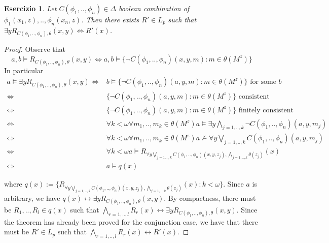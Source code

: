 \documentclass{article}
\newtheorem{exercise}{Esercizio}
\begin{document}
\begin{exercise}

	Let $C(\phi_1,..,\phi_n) \in \Delta$ boolean combination of $\phi_1(x_1,z),..,\phi_n(x_n,z)$.
	Then there exists $R' \in L_p$ such that $\exists y R_{C(\phi_1,..,\phi_n),\theta} (x,y) \iff R'(x)$.

\end{exercise}

\begin{proof}

	Observe that 
	\[
		a,b \models R_{C(\phi_1,..,\phi_n),\theta}(x,y) \iff a,b \models \{\neg C(\phi_1,..,\phi_n) (x,y,m) : m \in \theta(M^z) \}
	\]
	In particular 
	\begin{align*}
		a \models \exists y R_{C(\phi_1,..,\phi_n),\theta}(x,y) \iff & b \models \{\neg C(\phi_1,..,\phi_n)(a,y,m) : m \in \theta(M^z) \} \text{ for some } b \\
		\iff &  \{\neg C(\phi_1,..,\phi_n)(a,y,m) : m \in \theta(M^z) \} \text{ consistent } \\
		\iff &  \{\neg C(\phi_1,..,\phi_n)(a,y,m) : m \in \theta(M^z) \} \text{ finitely consistent } \\
		\iff & \forall k < \omega \forall m_1,..,m_k \in \theta(M^z) a \models \exists y \bigwedge_{j = 1,..,k} \neg C(\phi_1,..,\phi_n)(a,y,m_j) \\
		\iff & \forall k < \omega \forall m_1,..,m_k \in \theta(M^z) a \not \models \forall y \bigvee_{j = 1,..,k} C(\phi_1,..,\phi_n)(a,y,m_j) \\
		\iff & \forall k < \omega a \models R_{\forall y \bigvee_{j = 1,..,k} C(\phi_1,..,\phi_n)(x,y,z_j), \bigwedge_{j=1,..,k} \theta(z_j)}(x) \\
		\iff & a \models q(x)
	\end{align*}

	where $q(x) := \{R_{\forall y \bigvee_{j = 1,..,k} C(\phi_1,..,\phi_n)(x,y,z_j), \bigwedge_{j=1,..,k} \theta(z_j)}(x) : k < \omega \} $.
	Since $a$ is arbitrary, we have $q(x) \longleftrightarrow \exists y R_{C(\phi_1,..,\phi_n),\theta} (x,y)$.
	By compactness, there must be $R_1,..,R_l \in q(x)$ such that $\bigwedge_{r=1,..,l} R_r(x) \longleftrightarrow \exists y R_{C(\phi_1,..,\phi_n),\theta} (x,y)$.
	Since the theorem has already been proved for the conjunction case, we have that there must be $R' \in L_p$ such that 
	$\bigwedge_{r=1,..,l} R_r(x) \longleftrightarrow R'(x)$. 
	
\end{proof}
\end{document}
